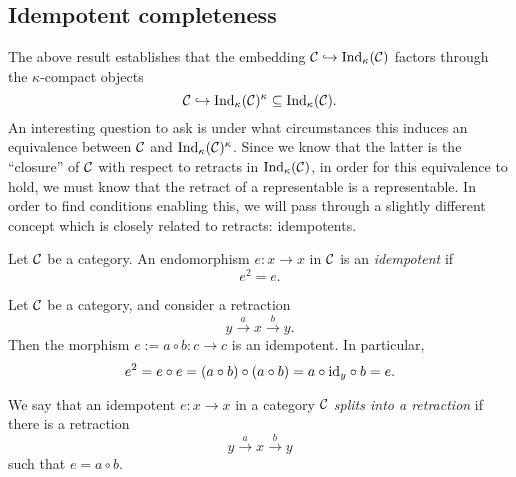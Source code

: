\subsection{Idempotent completeness}
The above result establishes that the embedding \(\mathcal{C}\hookrightarrow\operatorname{Ind}_\kappa(\mathcal{C})\) factors through the \(\kappa\)-compact objects
\[ \mathcal{C}\hookrightarrow\operatorname{Ind}_\kappa(\mathcal{C})^\kappa\subseteq\operatorname{Ind}_\kappa(\mathcal{C}). \]
An interesting question to ask is under what circumstances this induces an equivalence between \(\mathcal{C}\) and \(\operatorname{Ind}_\kappa(\mathcal{C})^\kappa\). Since we know that the latter
is the ``closure'' of \(\mathcal{C}\) with respect to retracts in \(\operatorname{Ind}_\kappa(\mathcal{C})\), in order for this equivalence to hold, we must know that the retract of a representable is
a representable. In order to find conditions enabling this, we will pass through a slightly different concept which is closely related to retracts: idempotents.
\begin{definition}
	Let \(\mathcal{C}\) be a category. An endomorphism \(e\!:x\to x\) in \(\mathcal{C}\) is an \emph{idempotent} if
	\[ e^2 = e. \]
\end{definition}
\begin{example}
	Let \(\mathcal{C}\) be a category, and consider a retraction
	\[ y \overset{a}\to x\overset{b}\to y. \]
	Then the morphism \(e := a\circ b\!: c\to c\) is an idempotent. In particular,
	\[ e^2 = e\circ e = (a \circ b) \circ (a\circ b) = a\circ \mathrm{id}_{y} \circ b = e. \]
\end{example}
\begin{definition}
	We say that an idempotent \(e\!:x\to x\) in a category \(\mathcal{C}\) \emph{splits into a retraction} if there is a retraction
	\[ y \overset{a}\to x\overset{b}\to y \]
	such that \(e = a\circ b\).
\end{definition}

